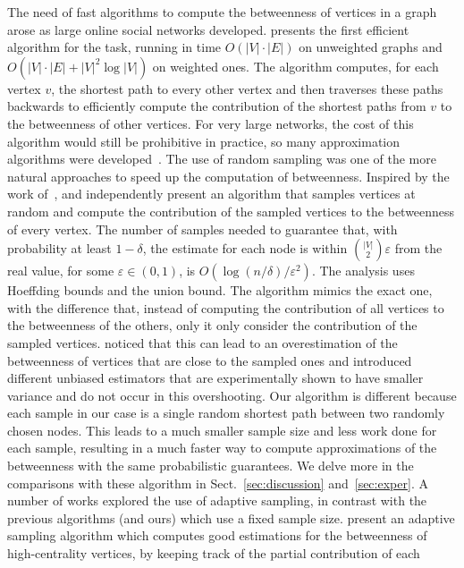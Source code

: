 The need of fast algorithms to compute the betweenness of vertices in a graph
arose as large online social networks developed. \citet{Brandes01} presents the
first efficient algorithm for the task, running in time $O(|V|\cdot|E|)$ on
unweighted graphs and $O(|V|\cdot|E|+|V|^2\log|V|)$ on weighted ones. The
algorithm computes, for each vertex $v$, the shortest path to every other vertex
and then traverses these paths backwards to efficiently compute the contribution
of the shortest paths from $v$ to the betweenness of other vertices. For very
large networks, the cost of this algorithm would still be prohibitive in
practice, so many approximation algorithms were
developed~\citep{JacobKLPT05,BrandesP07,BaderKMM07,GeisbergerSS08,MaiyaBW10,LimMRTB11}.
The use of random sampling was one of the more natural approaches to speed up
the computation of betweenness. Inspired by the work of~\citet{EppsteinW04},
\citet{JacobKLPT05} and independently \citet{BrandesP07} present an algorithm
that samples vertices at random and compute the contribution of the sampled
vertices to the betweenness of every vertex. The number of samples needed to
guarantee that, with probability at least $1-\delta$, the estimate for each node
is within $\binom{|V|}{2}\varepsilon$ from the real value, for some
$\varepsilon\in(0,1)$, is $O(\log(n/\delta)/\varepsilon^2)$. The analysis uses
Hoeffding bounds\citep{Hoeffding63} and the union bound. The algorithm mimics
the exact one, with the difference that, instead of computing the contribution
of all vertices to the betweenness of the others, only it only consider the
contribution of the sampled vertices. \citet{GeisbergerSS08} noticed that this
can lead to an overestimation of the betweenness of vertices that are close to
the sampled ones and introduced different unbiased estimators that are
experimentally shown to have smaller variance and do not occur in this
overshooting. Our algorithm is different because each sample in our case is a
single random shortest path between two randomly chosen nodes. This leads to a
much smaller sample size and less work done for each sample, resulting in a much
faster way to compute approximations of the betweenness with the same
probabilistic guarantees. We delve more in the comparisons with these algorithm
in Sect.~\ref{sec:discussion} and~\ref{sec:exper}. A number of works explored
the use of adaptive sampling, in contrast with the previous algorithms (and
ours) which use a fixed sample size.  \citet{BaderKMM07} present an adaptive
sampling algorithm which computes good estimations for the betweenness of
high-centrality vertices, by keeping track of the partial contribution of each
